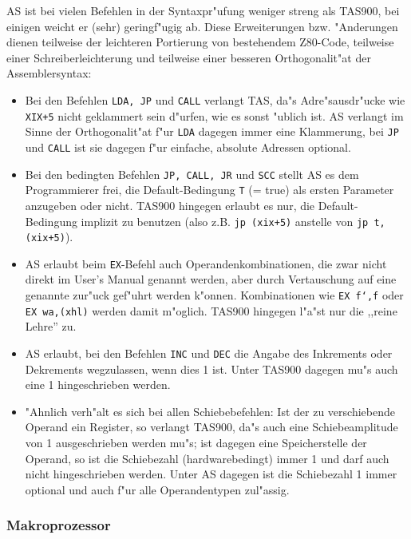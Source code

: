 \documentclass[12pt,a4paper,twoside]{report}
\newcommand{\tty}[1]{{\tt #1}}
\begin{document}
AS ist bei vielen Befehlen in der Syntaxpr"ufung weniger streng als TAS900,
bei einigen weicht er (sehr) geringf"ugig ab.  Diese Erweiterungen bzw.
"Anderungen dienen teilweise der leichteren Portierung von bestehendem
Z80-Code, teilweise einer Schreiberleichterung und teilweise einer besseren
Orthogonalit"at der Assemblersyntax:
\begin{itemize}
\item{Bei den Befehlen \tty{LDA, JP} und \tty{CALL} verlangt TAS, da"s
      Adre"sausdr"ucke wie \tty{XIX+5} nicht geklammert sein d"urfen, wie
      es sonst "ublich ist.  AS verlangt im Sinne der Orthogonalit"at f"ur
      \tty{LDA} dagegen immer eine Klammerung, bei \tty{JP} und \tty{CALL}
      ist sie dagegen f"ur einfache, absolute Adressen optional.}
\item{Bei den bedingten Befehlen \tty{JP, CALL, JR} und \tty{SCC} stellt
      AS es dem Programmierer frei, die Default-Bedingung \tty{T} (= true) als
      ersten Parameter anzugeben oder nicht.  TAS900 hingegen erlaubt es
      nur, die Default-Bedingung implizit zu benutzen (also z.B.
      \tty{jp (xix+5)} anstelle von \tty{jp t,(xix+5)}).}
\item{AS erlaubt beim \tty{EX}-Befehl auch Operandenkombinationen, die
      zwar nicht direkt im User's Manual\cite{Tosh900} genannt werden,
      aber durch Vertauschung auf eine genannte zur"uck gef"uhrt werden
      k"onnen.  Kombinationen wie \tty{EX f`,f} oder \tty{EX wa,(xhl)}
      werden damit m"oglich.  TAS900 hingegen l"a"st nur die ,,reine Lehre''
      zu.}
\item{AS erlaubt, bei den Befehlen \tty{INC} und \tty{DEC} die Angabe
      des Inkrements oder Dekrements wegzulassen, wenn dies 1 ist.  Unter
      TAS900 dagegen mu"s auch eine 1 hingeschrieben werden.}
\item{"Ahnlich verh"alt es sich bei allen Schiebebefehlen: Ist der zu
      verschiebende Operand ein Register, so verlangt TAS900, da"s auch
      eine Schiebeamplitude von 1 ausgeschrieben werden mu"s; ist dagegen
      eine Speicherstelle der Operand, so ist die Schiebezahl
      (hardwarebedingt) immer 1 und darf auch nicht hingeschrieben werden.
      Unter AS dagegen ist die Schiebezahl 1 immer optional und auch f"ur
      alle Operandentypen zul"assig.}
\end{itemize}

\subsubsection{Makroprozessor}
\end{document}
